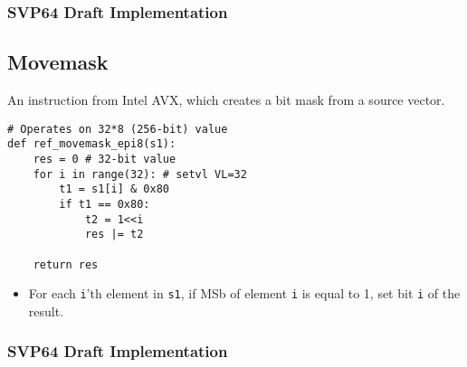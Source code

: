 \subsubsection{SVP64 Draft Implementation}

\subsection{Movemask}

An instruction from Intel AVX, which creates a bit mask from a source vector.

\begin{verbatim}
# Operates on 32*8 (256-bit) value
def ref_movemask_epi8(s1):
    res = 0 # 32-bit value
    for i in range(32): # setvl VL=32
        t1 = s1[i] & 0x80
        if t1 == 0x80:
            t2 = 1<<i
            res |= t2

    return res
\end{verbatim}

\begin{itemize}
  \item For each \texttt{i}'th element in \texttt{s1}, if \acrshort{MSb} of
        element \texttt{i} is equal to 1, set bit \texttt{i} of the result.
\end{itemize}

\subsubsection{SVP64 Draft Implementation}
